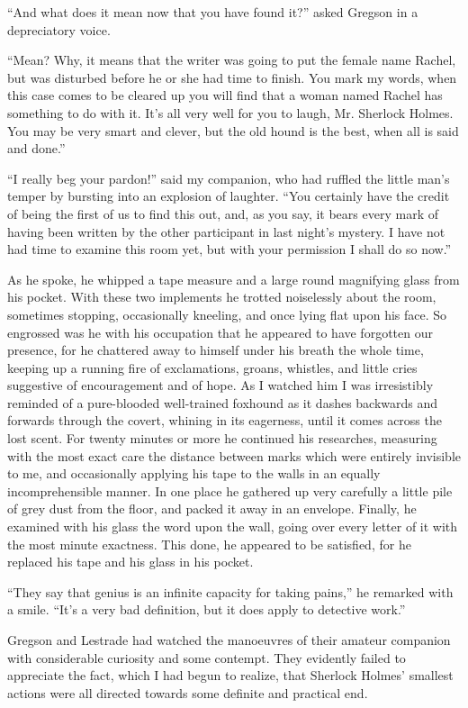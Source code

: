 \documentclass[12pt]{book}
\begin{document}
“And what does it mean now that you have found it?” asked Gregson in a depreciatory voice. 

“Mean? Why, it means that the writer was going to put the female name Rachel, but was disturbed before he or she had time to finish. You mark my words, when this case comes to be cleared up you will find that a woman named Rachel has something to do with it. It’s all very well for you to laugh, Mr. Sherlock Holmes. You may be very smart and clever, but the old hound is the best, when all is said and done.” 

“I really beg your pardon!” said my companion, who had ruffled the little man’s temper by bursting into an explosion of laughter. “You certainly have the credit of being the first of us to find this out, and, as you say, it bears every mark of having been written by the other participant in last night’s mystery. I have not had time to examine this room yet, but with your permission I shall do so now.” 

As he spoke, he whipped a tape measure and a large round magnifying glass from his pocket. With these two implements he trotted noiselessly about the room, sometimes stopping, occasionally kneeling, and once lying flat upon his face. So engrossed was he with his occupation that he appeared to have forgotten our presence, for he chattered away to himself under his breath the whole time, keeping up a running fire of exclamations, groans, whistles, and little cries suggestive of encouragement and of hope. As I watched him I was irresistibly reminded of a pure-blooded well-trained foxhound as it dashes backwards and forwards through the covert, whining in its eagerness, until it comes across the lost scent. For twenty minutes or more he continued his researches, measuring with the most exact care the distance between marks which were entirely invisible to me, and occasionally applying his tape to the walls in an equally incomprehensible manner. In one place he gathered up very carefully a little pile of grey dust from the floor, and packed it away in an envelope. Finally, he examined with his glass the word upon the wall, going over every letter of it with the most minute exactness. This done, he appeared to be satisfied, for he replaced his tape and his glass in his pocket. 

“They say that genius is an infinite capacity for taking pains,” he remarked with a smile. “It’s a very bad definition, but it does apply to detective work.” 

Gregson and Lestrade had watched the manoeuvres of their amateur companion with considerable curiosity and some contempt. They evidently failed to appreciate the fact, which I had begun to realize, that Sherlock Holmes’ smallest actions were all directed towards some definite and practical end. 
\end{document}

